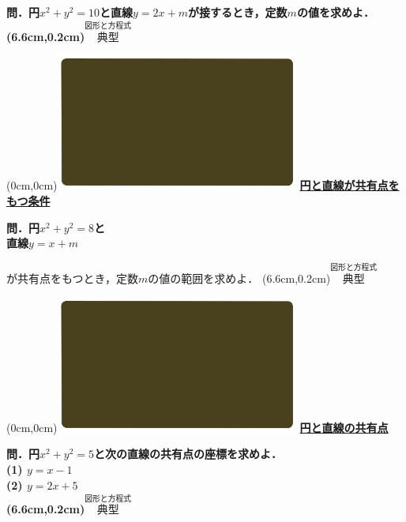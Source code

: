 \documentclass[10pt,
fleqn,
dvipdfmx,
uplatex
]{jsarticle}
\begin{document}
\LARGE 
\bf\boldmath 問．円$x^2+y^2={10}$と直線$y=2x+m$が接するとき，定数$m$の値を求めよ．
\at(6.6cm,0.2cm){\small\color{bradorange}$\overset{\text{図形と方程式}}{\text{典型}}$}


\newpage



\at(0cm,0cm){\includegraphics[width=8cm,bb=0 0 1920 1080]{./media_local/smart_background/図形と方程式.jpeg}}
{\color{orange}\bf\boldmath\Large\underline{円と直線が共有点をもつ条件}}\vspace{0.3zw}

\Large 
\bf\boldmath 問．円$x^2+y^2=8$と\\
\hfill 直線$y=x+m$

\LARGE 
が共有点をもつとき，定数$m$の値の範囲を求めよ．
\at(6.6cm,0.2cm){\small\color{bradorange}$\overset{\text{図形と方程式}}{\text{典型}}$}


\newpage



\at(0cm,0cm){\includegraphics[width=8cm,bb=0 0 1920 1080]{./media_local/smart_background/図形と方程式.jpeg}}
{\color{orange}\bf\boldmath\LARGE\underline{円と直線の共有点}}\vspace{0.3zw}

\Large 
\bf\boldmath 問．円$x^2+y^2=5$と次の直線の共有点の座標を求めよ．\\
(1)  $y=x-1$\\
(2)  $y=2x+5$\\

\at(6.6cm,0.2cm){\small\color{bradorange}$\overset{\text{図形と方程式}}{\text{典型}}$}
\end{document}
